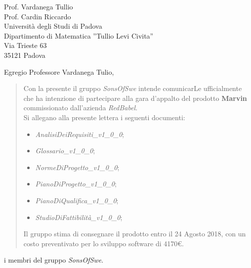 \documentclass{letter}
\newcommand{\gruppo}{\emph{SonsOfSwe}}
\begin{document}
	
\begin{letter} {   
	\hfill Prof. Vardanega Tullio \\
	\hfill Prof. Cardin Riccardo \\
	\hfill Università degli Studi di Padova \\
	\hfill Dipartimento di Matematica ''Tullio Levi Civita'' \\
	\hfill Via Trieste 63 \\
	\hfill 35121 Padova \\
}

\date{}
\opening{Egregio Professore Vardanega Tulio,}
	\begin{quotation}
		\noindent Con la presente il gruppo \textit{\gruppo} intende comunicarLe ufficialmente che ha intenzione di partecipare alla gara d'appalto del prodotto \textbf{Marvin} commissionato dall'azienda \textit{RedBabel}.\\
		Si allegano alla presente lettera i seguenti documenti:
		\begin{itemize}
			\item \textit{AnalisiDeiRequisiti\_v1\_0\_0};
			\item \textit{Glossario\_v1\_0\_0};
			\item \textit{NormeDiProgetto\_v1\_0\_0};
			\item \textit{PianoDiProgetto\_v1\_0\_0};
			\item \textit{PianoDiQualifica\_v1\_0\_0};
			\item \textit{StudioDiFattibilità\_v1\_0\_0};
		\end{itemize}
		Il gruppo stima di consegnare il prodotto entro il 24 Agosto 2018, con un costo preventivato per lo sviluppo software di 4170\euro.
	\end{quotation}
{
	\setlength\parindent{24pt}
	\indent i membri del gruppo \gruppo.
}
\end{letter}
\end{document}
